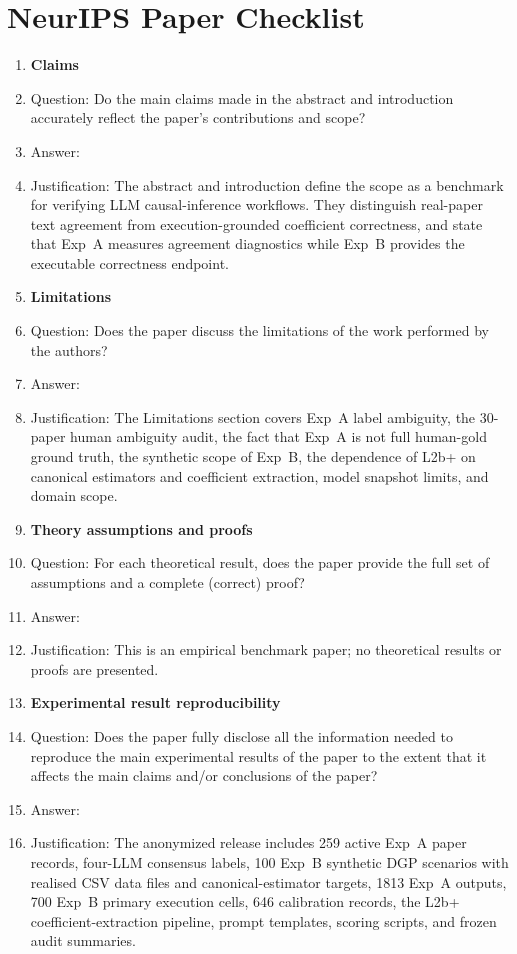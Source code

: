 
\section*{NeurIPS Paper Checklist}

\begin{enumerate}

\item {\bf Claims}
    \item[] Question: Do the main claims made in the abstract and introduction accurately reflect the paper's contributions and scope?
    \item[] Answer: \answerYes{}
    \item[] Justification: The abstract and introduction define the scope as a benchmark for verifying LLM causal-inference workflows. They distinguish real-paper text agreement from execution-grounded coefficient correctness, and state that Exp~A measures agreement diagnostics while Exp~B provides the executable correctness endpoint.

\item {\bf Limitations}
    \item[] Question: Does the paper discuss the limitations of the work performed by the authors?
    \item[] Answer: \answerYes{}
    \item[] Justification: The Limitations section covers Exp~A label ambiguity, the 30-paper human ambiguity audit, the fact that Exp~A is not full human-gold ground truth, the synthetic scope of Exp~B, the dependence of L2b+ on canonical estimators and coefficient extraction, model snapshot limits, and domain scope.

\item {\bf Theory assumptions and proofs}
    \item[] Question: For each theoretical result, does the paper provide the full set of assumptions and a complete (correct) proof?
    \item[] Answer: \answerNA{}
    \item[] Justification: This is an empirical benchmark paper; no theoretical results or proofs are presented.

\item {\bf Experimental result reproducibility}
    \item[] Question: Does the paper fully disclose all the information needed to reproduce the main experimental results of the paper to the extent that it affects the main claims and/or conclusions of the paper?
    \item[] Answer: \answerYes{}
\item[] Justification: The anonymized release includes 259 active Exp~A paper records, four-LLM consensus labels, 100 Exp~B synthetic DGP scenarios with realised CSV data files and canonical-estimator targets, 1813 Exp~A outputs, 700 Exp~B primary execution cells, 646 calibration records, the L2b+ coefficient-extraction pipeline, prompt templates, scoring scripts, and frozen audit summaries.


\end{enumerate}
